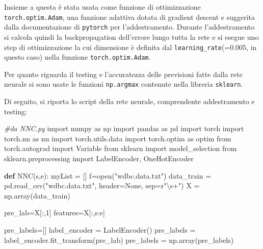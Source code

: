 \documentclass[11pt]{article}
\newenvironment{Shaded}{}{}
\newcommand{\KeywordTok}[1]{\textcolor[rgb]{0.00,0.44,0.13}{\textbf{{#1}}}}
\newcommand{\DecValTok}[1]{\textcolor[rgb]{0.25,0.63,0.44}{{#1}}}
\newcommand{\StringTok}[1]{\textcolor[rgb]{0.25,0.44,0.63}{{#1}}}
\newcommand{\CommentTok}[1]{\textcolor[rgb]{0.38,0.63,0.69}{\textit{{#1}}}}
\newcommand{\NormalTok}[1]{{#1}}
\newcommand{\VerbatimStringTok}[1]{\textcolor[rgb]{0.25,0.44,0.63}{{#1}}}
\newcommand{\ImportTok}[1]{{#1}}
\newcommand{\VariableTok}[1]{\textcolor[rgb]{0.10,0.09,0.49}{{#1}}}
\newcommand{\OperatorTok}[1]{\textcolor[rgb]{0.40,0.40,0.40}{{#1}}}
\newcommand{\BuiltInTok}[1]{{#1}}
\begin{document}
Insieme a questa è stata usata come funzione di ottimizzazione
\texttt{torch.optim.Adam}, una funzione adattiva dotata di gradient
descent e suggerita dalla documentazione di \texttt{pytorch} per
l'addestramento. Durante l'addestramento si calcola quindi la
backpropagation dell'errore lungo tutta la rete e si esegue uno step di
ottimizzazione la cui dimensione è definita dal
\texttt{learning\_rate}(=0.005, in questo caso) nella funzione
\texttt{torch.optim.Adam}.

Per quanto riguarda il testing e l'accuratezza delle previsioni fatte
dalla rete neurale si sono usate le funzioni \texttt{np.argmax}
contenute nella libreria \texttt{sklearn}.

Di seguito, si riporta lo script della rete neurale, comprendente
addestramento e testing:

\begin{Shaded}
\begin{Highlighting}[]
\CommentTok{#da NNC.py}
\ImportTok{import}\NormalTok{ numpy }\ImportTok{as}\NormalTok{ np}
\ImportTok{import}\NormalTok{ pandas }\ImportTok{as}\NormalTok{ pd}
\ImportTok{import}\NormalTok{ torch}
\ImportTok{import}\NormalTok{ torch.nn }\ImportTok{as}\NormalTok{ nn}
\ImportTok{import}\NormalTok{ torch.utils.data}
\ImportTok{import}\NormalTok{ torch.optim }\ImportTok{as}\NormalTok{ optim}
\ImportTok{from}\NormalTok{ torch.autograd }\ImportTok{import}\NormalTok{ Variable}
\ImportTok{from}\NormalTok{ sklearn }\ImportTok{import}\NormalTok{ model_selection}
\ImportTok{from}\NormalTok{ sklearn.preprocessing }\ImportTok{import}\NormalTok{ LabelEncoder, OneHotEncoder}

\KeywordTok{def}\NormalTok{ NNC(s,e):}
\NormalTok{    myList }\OperatorTok{=}\NormalTok{ []}
\NormalTok{    f}\OperatorTok{=}\BuiltInTok{open}\NormalTok{(}\StringTok{"wdbc.data.txt"}\NormalTok{)}
\NormalTok{    data_train }\OperatorTok{=}\NormalTok{ pd.read_csv(}\StringTok{"wdbc.data.txt"}\NormalTok{, header}\OperatorTok{=}\VariableTok{None}\NormalTok{, sep}\OperatorTok{=}\VerbatimStringTok{r"\textbackslash{}s+"}\NormalTok{)}
\NormalTok{    X }\OperatorTok{=}\NormalTok{ np.array(data_train)}
    
\NormalTok{    pre_lab}\OperatorTok{=}\NormalTok{X[:,}\DecValTok{1}\NormalTok{]  }
\NormalTok{    features}\OperatorTok{=}\NormalTok{X[:,s:e]}
    
\NormalTok{    pre_labels}\OperatorTok{=}\NormalTok{[]}
\NormalTok{    label_encoder }\OperatorTok{=}\NormalTok{ LabelEncoder()                                  }
\NormalTok{    pre_labels }\OperatorTok{=}\NormalTok{ label_encoder.fit_transform(pre_lab)}
\NormalTok{    pre_labels }\OperatorTok{=}\NormalTok{ np.array(pre_labels)}
    

\end{Highlighting}
\end{Shaded}
\end{document}
